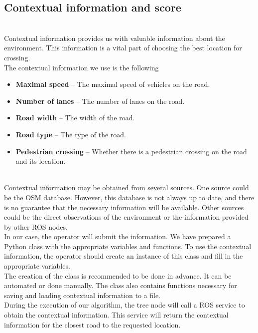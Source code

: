     \subsection{Contextual information and score}
    \label{sec:context}
        \\
            Contextual information provides us with valuable information about the environment. This information is a vital part of choosing the best location for crossing.\\
            The contextual information we use is the following
            \begin{itemize}
                \item \textbf{Maximal speed} -- The maximal speed of vehicles on the road.
                \item \textbf{Number of lanes} -- The number of lanes on the road.
                \item \textbf{Road width} -- The width of the road.
                \item \textbf{Road type} -- The type of the road.
                \item \textbf{Pedestrian crossing} -- Whether there is a pedestrian crossing on the road and its location.
            \end{itemize}
        \\
            Contextual information may be obtained from several sources. One source could be the OSM database. However, this database is not always up to date, and there is no guarantee that the necessary information will be available. Other sources could be the direct observations of the environment or the information provided by other ROS nodes.\\
            In our case, the operator will submit the information. We have prepared a Python class with the appropriate variables and functions. To use the contextual information, the operator should create an instance of this class and fill in the appropriate variables.\\
            The creation of the class is recommended to be done in advance. It can be automated or done manually. The class also contains functions necessary for saving and loading contextual information to a file.\\
            During the execution of our algorithm, the tree node will call a ROS service to obtain the contextual information. This service will return the contextual information for the closest road to the requested location.\\
